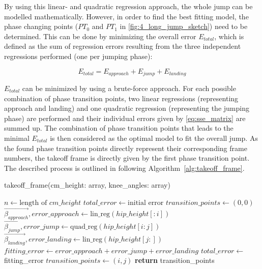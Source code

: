 \noindent By using this linear- and quadratic regression approach, the whole
jump can be modelled mathematically.
However, in order to find the best fitting model, the phase changing points
($PT_0$ and $PT_1$ in \autoref{fig:4_long_jump_sketch}) need to be determined.
This can be done by minimizing the overall error $E_{total}$, which is defined
as the sum of regression errors resulting from the three independent
regressions performed (one per jumping phase):

\begin{equation}
    E_{total} = E_{approach} + E_{jump} + E_{landing}
\end{equation}

\noindent $E_{total}$ can be minimized by using a brute-force approach.
For each possible combination of phase transition points, two linear
regressions (representing approach and landing) and one quadratic regression
(representing the jumping phase) are performed and their individual errors
given by \autoref{eq:sse_matrix} are summed up.
The combination of phase transition points that leads to the minimal
$E_{total}$ is then considered as the optimal model to fit the overall jump.
As the found phase transition points directly represent their corresponding
frame numbers, the takeoff frame is directly given by the first phase
transition point.\\
The described process is outlined in following
Algorithm~\ref{alg:takeoff_frame}.
\begin{algorithm}[h!]
    \caption{takeoff\_frame(cm\_height: array, knee\_angles: array)}
    \begin{algorithmic}[1]
        \State $n \gets \text{length of } cm\_height$
        \State $total\_error \gets \text{initial error}$
        \State $transition\_points \gets (0,0)$
            \State $\vec{\beta_{approach}}, error\_approach \gets \text{lin\_reg}(hip\_height[:i])$
            \State $\vec{\beta_{jump}}, error\_jump \gets \text{quad\_reg}(hip\_height[i:j])$
            \State $\vec{\beta_{landing}}, error\_landing \gets \text{lin\_reg}(hip\_height[j:])$
            \State $fitting\_error \gets error\_approach + error\_jump + error\_landing$
                    \State $total\_error \gets$ fitting\_error
                    \State $transition\_points \gets (i,j)$
                \EndIf
            \EndFor
        \EndFor
        \State \textbf{return} transition\_points
    \end{algorithmic}
\label{alg:takeoff_frame}
\end{algorithm}
\FloatBarrier


